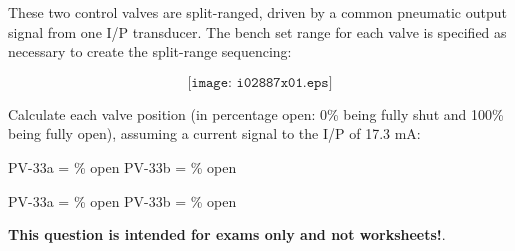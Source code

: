 

These two control valves are split-ranged, driven by a common pneumatic output signal from one I/P transducer.  The bench set range for each valve is specified as necessary to create the split-range sequencing:

$$\texttt{[image: i02887x01.eps]}$$

Calculate each valve position (in percentage open: 0\% being fully shut and 100\% being fully open), assuming a current signal to the I/P of 17.3 mA:

\vskip 20pt

\hskip 50pt PV-33a = \underbar{\hskip 50pt} \% open \hskip 60pt PV-33b = \underbar{\hskip 50pt} \% open







PV-33a =  \% open \hskip 100pt PV-33b =  \% open







{\bf This question is intended for exams only and not worksheets!}.


